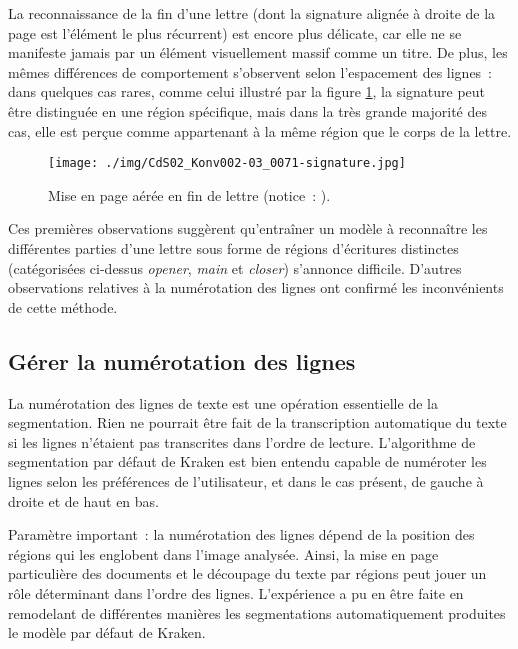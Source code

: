 \documentclass[a4paper,12pt,twoside]{book}
\begin{document}
				La reconnaissance de la fin d'une lettre (dont la signature alignée à droite de la page est l'élément le plus récurrent) est encore plus délicate, car elle ne se manifeste jamais par un élément visuellement massif comme un titre. De plus, les mêmes différences de comportement s'observent selon l'espacement des lignes~: dans quelques cas rares, comme celui illustré par la figure \ref{seg-signaure-71}, la signature peut être distinguée en une région spécifique, mais dans la très grande majorité des cas, elle est perçue comme appartenant à la même région que le corps de la lettre.
				
				\begin{figure}[!h]
					\centering
					\texttt{[image: ./img/CdS02\_Konv002-03\_0071-signature.jpg]}%
					\caption{Mise en page aérée en fin de lettre (notice~: \cite{CdS02070071}).}%
					\label{seg-signaure-71}%
				\end{figure}
				
				Ces premières observations suggèrent qu'entraîner un modèle à reconnaître les différentes parties d'une lettre sous forme de régions d'écritures distinctes (catégorisées ci-dessus \textit{opener}, \textit{main} et \textit{closer}) s'annonce difficile. D'autres observations relatives à la numérotation des lignes ont confirmé les inconvénients de cette méthode.
				
			\subsection{Gérer la numérotation des lignes}
				La numérotation des lignes de texte est une opération essentielle de la segmentation. Rien ne pourrait être fait de la transcription automatique du texte si les lignes n'étaient pas transcrites dans l'ordre de lecture. L'algorithme de segmentation par défaut de Kraken est bien entendu capable de numéroter les lignes selon les préférences de l'utilisateur, et dans le cas présent, de gauche à droite et de haut en bas.
				
				Paramètre important~: la numérotation des lignes dépend de la position des régions qui les englobent dans l'image analysée. Ainsi, la mise en page particulière des documents et le découpage du texte par régions peut jouer un rôle déterminant dans l'ordre des lignes. L'expérience a pu en être faite en remodelant de différentes manières les segmentations automatiquement produites le modèle par défaut de Kraken.
				
\end{document}
